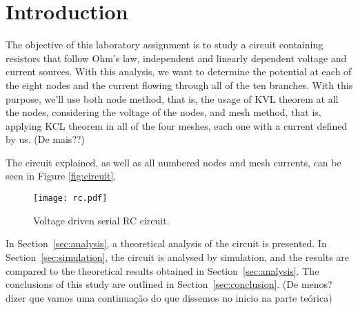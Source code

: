 \section{Introduction}
\label{sec:introduction}

The objective of this laboratory assignment is to study a circuit containing resistors that follow Ohm's law, independent and linearly dependent voltage and current sources. With this analysis, we want to determine the potential at each of the eight nodes and the current flowing through all of the ten branches.
With this purpose, we'll use both node method, that is, the usage of KVL theorem at all the nodes, considering the voltage of the nodes, and mesh method, that is, applying KCL theorem in all of the four meshes, each one with a current defined by us. (De mais??)
\par
The circuit explained, as well as all numbered nodes and mesh currents, can be seen in Figure \ref{fig:circuit}.

\begin{figure}[h] \centering
\texttt{[image: rc.pdf]}
\caption{Voltage driven serial RC circuit.}
\label{fig:rc}
\end{figure}


In Section~\ref{sec:analysis}, a theoretical analysis of the circuit is
presented. In Section~\ref{sec:simulation}, the circuit is analysed by
simulation, and the results are compared to the theoretical results obtained in
Section~\ref{sec:analysis}. The conclusions of this study are outlined in
Section~\ref{sec:conclusion}. (De menos? dizer que vamos uma continuação do que dissemos no inicio na parte teórica)

